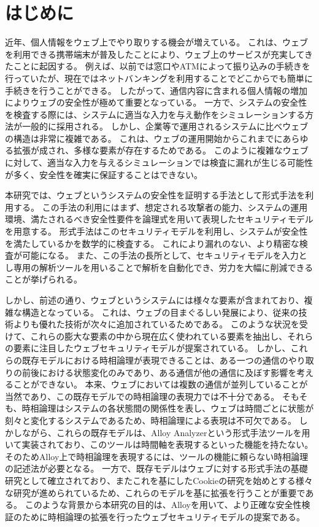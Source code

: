 \documentclass[12pt,a4paper]{jbook}
\begin{document}
\newpage

\chapter{はじめに}
近年、個人情報をウェブ上でやり取りする機会が増えている。
これは、ウェブを利用できる携帯端末が普及したことにより、ウェブ上のサービスが充実してきたことに起因する。
例えば、以前では窓口やATMによって振り込みの手続きを行っていたが、現在ではネットバンキングを利用することでどこからでも簡単に手続きを行うことができる。
したがって、通信内容に含まれる個人情報の増加によりウェブの安全性が極めて重要となっている。
一方で、システムの安全性を検査する際には、システムに適当な入力を与え動作をシミュレーションする方法が一般的に採用される。
しかし、企業等で運用されるシステムに比べウェブの構造は非常に複雑である。
これは、ウェブの運用開始からこれまでにあらゆる拡張が成され、多様な要素が存在するためである。
このように複雑なウェブに対して、適当な入力を与えるシミュレーションでは検査に漏れが生じる可能性が多く、安全性を確実に保証することはできない。

本研究では、ウェブというシステムの安全性を証明する手法として形式手法を利用する。
この手法の利用にはまず、想定される攻撃者の能力、システムの運用環境、満たされるべき安全性要件を論理式を用いて表現したセキュリティモデルを用意する。
形式手法はこのセキュリティモデルを利用し、システムが安全性を満たしているかを数学的に検査する。
これにより漏れのない、より精密な検査が可能になる。
また、この手法の長所として、セキュリティモデルを入力とし専用の解析ツールを用いることで解析を自動化でき、労力を大幅に削減できることが挙げられる。

しかし、前述の通り、ウェブというシステムには様々な要素が含まれており、複雑な構造となっている。
これは、ウェブの目まぐるしい発展により、従来の技術よりも優れた技術が次々に追加されているためである。
このような状況を受けて、これらの膨大な要素の中から現在広く使われている要素を抽出し、それらの要素に注目したウェブセキュリティモデルが提案されている\cite{based-model,cookie-model}。
しかし、これらの既存モデルにおける時相論理が表現できることは、ある一つの通信のやり取りの前後における状態変化のみであり、ある通信が他の通信に及ぼす影響を考えることができない。
本来、ウェブにおいては複数の通信が並列していることが当然であり、この既存モデルでの時相論理の表現力では不十分である。
そもそも、時相論理はシステムの各状態間の関係性を表し、ウェブは時間ごとに状態が刻々と変化するシステムであるため、時相論理による表現は不可欠である。
しかしながら、これらの既存モデル\cite{based-model,cookie-model}は、Alloy Analyzerという形式手法ツールを用いて実装されており、このツールは時間軸を表現するといった機能を持たない。
そのためAlloy上で時相論理を表現するには、ツールの機能に頼らない時相論理の記述法が必要となる。
一方で、既存モデル\cite{based-model}はウェブに対する形式手法の基礎研究として確立されており、またこれを基にしたCookieの研究\cite{cookie-model}を始めとする様々な研究\cite{chaitanya2017formal, bagheri2016practical, chen2015aspire, nelson2013aluminum, somorovsky2011all}が進められているため、これらのモデルを基に拡張を行うことが重要である。
このような背景から本研究の目的は、Alloyを用いて、より正確な安全性検証のために時相論理の拡張を行ったウェブセキュリティモデルの提案である。
\end{document}
